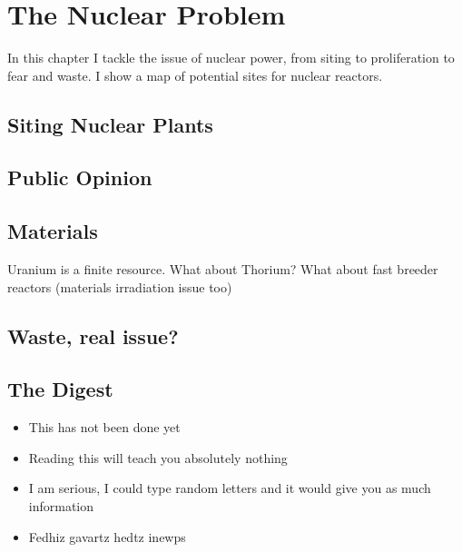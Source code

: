 \setchapterpreamble[u]{\margintoc}
\chapter{The Nuclear Problem}

In this chapter I tackle the issue of nuclear power, from siting to proliferation to fear and waste. I show a map of
potential sites for nuclear reactors.


\blindtext

\section{Siting Nuclear Plants}

\blindtext

\section{Public Opinion}

\blindtext

\section{Materials}

Uranium is a finite resource. What about Thorium? What about fast breeder reactors (materials irradiation issue too)

\blindtext

\section{Waste, real issue?}

\blindtext

\section{The Digest}


\begin{kaoboxgreen}[frametitle=Main Takeaways]

\begin{itemize}
\item This has not been done yet
\item Reading this will teach you absolutely nothing
\item I am serious, I could type random letters and it would give you as much information
\item Fedhiz gavartz hedtz inewps
\end{itemize}
  
\end{kaoboxgreen}